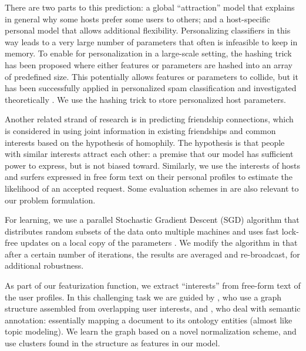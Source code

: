 There are two parts to this prediction: a global ``attraction'' model that explains in general why some hosts prefer some users to others; and a host-specific personal model that allows additional flexibility.
Personalizing classifiers in this way leads to a very large number of parameters that often is infeasible to keep in memory.
To enable for personalization in a large-scale setting, the hashing trick has been proposed where either features or parameters are hashed into an array of predefined size.
This potentially allows features or parameters to collide, but it has been successfully applied in personalized spam classification \cite{Attenberg2009} and investigated theoretically \cite{Weinberger2012}.
We use the hashing trick to store personalized host parameters.

Another related strand of research is in predicting friendship connections, which is considered in \cite{Yang2011} using joint information in existing friendships and common interests based on the hypothesis of homophily.
The hypothesis is that people with similar interests attract each other: a premise that our model has sufficient power to express, but is not biased toward.
Similarly, we use the interests of hosts and surfers expressed in free form text on their personal profiles to estimate the likelihood of an accepted request.
Some evaluation schemes in \cite{Yang2011} are also relevant to our problem formulation.

For learning, we use a parallel Stochastic Gradient Descent (SGD) algorithm that distributes random subsets of the data onto multiple machines and uses fast lock-free updates on a local copy of the parameters \cite{Zinkevich2010}.
We modify the algorithm in that after a certain number of iterations, the results are averaged and re-broadcast, for additional robustness.

As part of our featurization function, we extract ``interests'' from free-form text of the user profiles.
In this challenging task we are guided by \cite{Liu2005}, who use a graph structure assembled from overlapping user interests, and \cite{Cantador2011}, who deal with semantic annotation: essentially mapping a document to its ontology entities (almost like topic modeling).
We learn the graph based on a novel normalization scheme, and use clusters found in the structure as features in our model.


